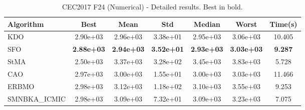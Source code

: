 \begin{table}[H]
\centering\small
\caption{CEC2017 F24 (Numerical) - Detailed results. Best in bold.}
\label{tab:cec2017_F24}
\begin{tabular}{lcccccc}
\toprule
\textbf{Algorithm} & \textbf{Best} & \textbf{Mean} & \textbf{Std} & \textbf{Median} & \textbf{Worst} & \textbf{Time(s)} \\
\midrule
KDO & 2.90e+03 & 2.96e+03 & 3.38e+01 & 2.95e+03 & 3.06e+03 & 10.405 \\
SFO & \textbf{2.88e+03} & \textbf{2.94e+03} & \textbf{3.52e+01} & \textbf{2.93e+03} & \textbf{3.03e+03} & \textbf{9.287} \\
StMA & 2.50e+03 & 3.37e+03 & 3.28e+02 & 3.45e+03 & 3.83e+03 & 5.728 \\
CAO & 2.97e+03 & 3.00e+03 & 1.55e+01 & 3.00e+03 & 3.03e+03 & 11.466 \\
ERBMO & 2.98e+03 & 3.12e+03 & 1.18e+02 & 3.10e+03 & 3.55e+03 & 9.253 \\
SMNBKA_ICMIC & 2.98e+03 & 3.09e+03 & 7.32e+01 & 3.09e+03 & 3.23e+03 & 7.075 \\
\bottomrule
\end{tabular}
\end{table}

